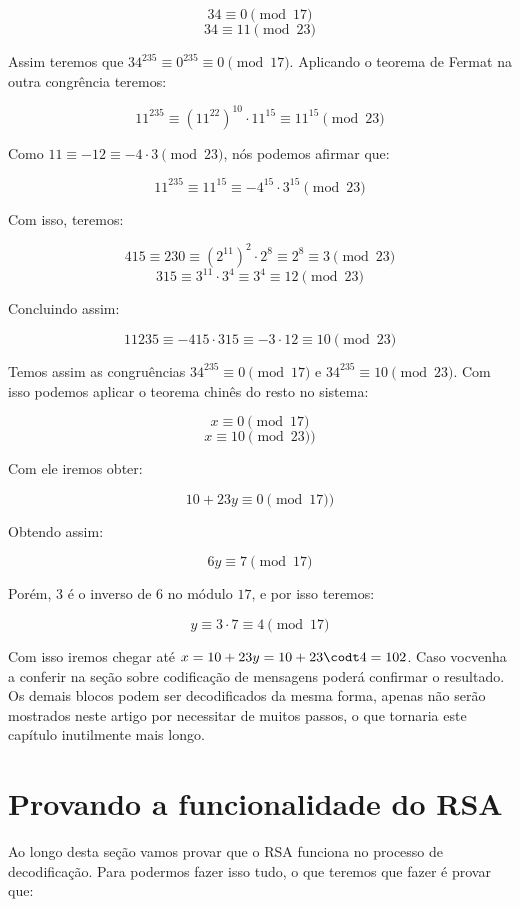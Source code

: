 $$34 \equiv 0 \pmod{17}$$
$$34 \equiv 11 \pmod{23}$$

Assim teremos que $34^{235} \equiv 0^{235} \equiv 0 \pmod{17}$. Aplicando o teorema de Fermat na outra congr\^encia teremos:

$$11^{235} \equiv (11^{22})^{10} \cdot 11^{15} \equiv 11^{15} \pmod{23}$$

Como $ 11 \equiv -12 \equiv -4 \cdot 3 \pmod{23}$, n\'os podemos afirmar que:

$$11^{235} \equiv 11^{15} \equiv -4^{15} \cdot 3^{15}\pmod{23}$$

Com isso, teremos:

$$415 \equiv 230 \equiv (2^{11})^2 \cdot 2^8 \equiv 2^8 \equiv 3 \pmod{23}$$
$$315 \equiv 3^{11} \cdot 3^4 \equiv 3^4 \equiv 12 \pmod{23}$$

Concluindo assim:

$$11235 \equiv -415 \cdot 315 \equiv -3 \cdot 12 \equiv 10 \pmod{23}$$

Temos assim as congru\^encias $34^{235} \equiv 0 \pmod{17}$ e $34^{235} \equiv 10 \pmod{23}$. Com isso podemos aplicar o teorema chin\^es do resto no sistema:

$$x \equiv 0 \pmod{17}$$
$$x \equiv 10 \pmod{23})$$

Com ele iremos obter: 

$$10 + 23y \equiv 0 \pmod{17})$$

Obtendo assim:

$$6y \equiv 7 \pmod{17}$$

Por\'em, $3$ \'e o inverso de $6$ no m\'odulo $17$, e por isso teremos:

$$y \equiv 3 \cdot 7 \equiv 4 \pmod{17}$$

Com isso iremos chegar at\'e $x = 10 + 23y = 10 + 23 \codt 4 = 102$. Caso voc\ê venha a conferir na se\c{c}\~ao sobre codifica\c{c}\~ao de mensagens poder\'a confirmar o resultado. Os demais blocos podem ser decodificados da mesma forma, apenas n\~ao ser\~ao mostrados neste artigo por necessitar de muitos passos, o que tornaria este cap\'itulo inutilmente mais longo.

\section{Provando a funcionalidade do RSA}

Ao longo desta se\c{c}\~ao vamos provar que o RSA funciona no processo de decodifica\c{c}\~ao. Para podermos fazer isso tudo, o que teremos que fazer \'e provar que:

